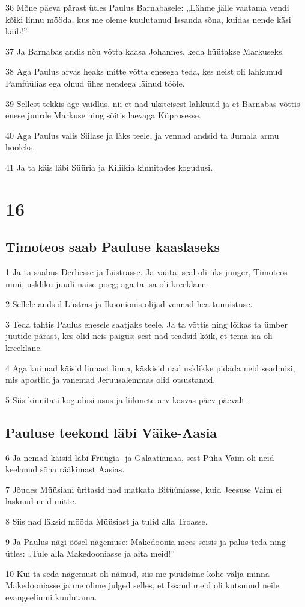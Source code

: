 \par 36 Mõne päeva pärast ütles Paulus Barnabasele: „Lähme jälle vaatama vendi kõiki linnu mööda, kus me oleme kuulutanud Issanda sõna, kuidas nende käsi käib!”
\par 37 Ja Barnabas andis nõu võtta kaasa Johannes, keda hüütakse Markuseks.
\par 38 Aga Paulus arvas heaks mitte võtta enesega teda, kes neist oli lahkunud Pamfüülias ega olnud ühes nendega läinud tööle.
\par 39 Sellest tekkis äge vaidlus, nii et nad üksteisest lahkusid ja et Barnabas võttis enese juurde Markuse ning sõitis laevaga Küprosesse.
\par 40 Aga Paulus valis Siilase ja läks teele, ja vennad andsid ta Jumala armu hooleks.
\par 41 Ja ta käis läbi Süüria ja Kiliikia kinnitades kogudusi.


\chapter{16}

\section*{Timoteos saab Pauluse kaaslaseks}

\par 1 Ja ta saabus Derbesse ja Lüstrasse. Ja vaata, seal oli üks jünger, Timoteos nimi, uskliku juudi naise poeg; aga ta isa oli kreeklane.
\par 2 Sellele andsid Lüstras ja Ikoonionis olijad vennad hea tunnistuse.
\par 3 Teda tahtis Paulus enesele saatjaks teele. Ja ta võttis ning lõikas ta ümber juutide pärast, kes olid neis paigus; sest nad teadsid kõik, et tema isa oli kreeklane.
\par 4 Aga kui nad käisid linnast linna, käskisid nad usklikke pidada neid seadmisi, mis apostlid ja vanemad Jeruusalemmas olid otsustanud.
\par 5 Siis kinnitati kogudusi usus ja liikmete arv kasvas päev-päevalt.

\section*{Pauluse teekond läbi Väike-Aasia}

\par 6 Ja nemad käisid läbi Früügia- ja Galaatiamaa, sest Püha Vaim oli neid keelanud sõna rääkimast Aasias.
\par 7 Jõudes Müüsiani üritasid nad matkata Bitüüniasse, kuid Jeesuse Vaim ei lasknud neid mitte.
\par 8 Siis nad läksid mööda Müüsiast ja tulid alla Troasse.
\par 9 Ja Paulus nägi öösel nägemuse: Makedoonia mees seisis ja palus teda ning ütles: „Tule alla Makedooniasse ja aita meid!”
\par 10 Kui ta seda nägemust oli näinud, siis me püüdsime kohe välja minna Makedooniasse ja me olime julged selles, et Issand meid oli kutsunud neile evangeeliumi kuulutama.

